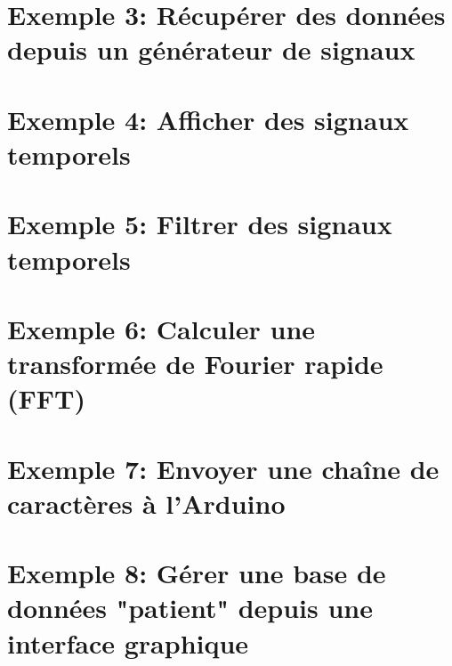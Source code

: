 \documentclass{article}
\begin{document}

\section{Exemple 3: Récupérer des données depuis un générateur de signaux}

\section{Exemple 4: Afficher des signaux temporels}

\section{Exemple 5: Filtrer des signaux temporels}


\section{Exemple 6: Calculer une transformée de Fourier rapide (FFT)}


\section{Exemple 7:  Envoyer une chaîne de caractères à l'Arduino}

\section{Exemple 8:  Gérer une base de données "patient" depuis une interface graphique}
\end{document}
